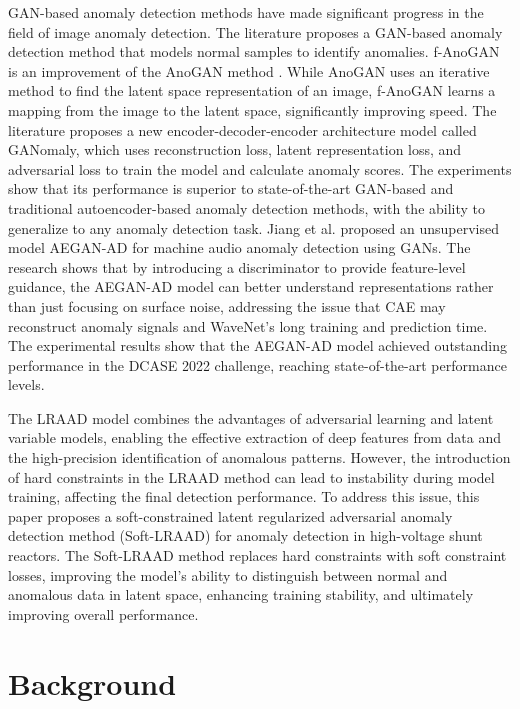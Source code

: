 \documentclass{article}
\begin{document}
GAN-based anomaly detection methods have made significant progress in the field of image anomaly detection. The literature \cite{anogan} proposes a GAN-based anomaly detection method that models normal samples to identify anomalies. f-AnoGAN \cite{f-anogan} is an improvement of the AnoGAN method \cite{anogan}. While AnoGAN uses an iterative method to find the latent space representation of an image, f-AnoGAN learns a mapping from the image to the latent space, significantly improving speed. The literature \cite{ganomaly} proposes a new encoder-decoder-encoder architecture model called GANomaly, which uses reconstruction loss, latent representation loss, and adversarial loss to train the model and calculate anomaly scores. The experiments show that its performance is superior to state-of-the-art GAN-based and traditional autoencoder-based anomaly detection methods, with the ability to generalize to any anomaly detection task. Jiang et al. \cite{AEGAN-AD} proposed an unsupervised model AEGAN-AD for machine audio anomaly detection using GANs. The research shows that by introducing a discriminator to provide feature-level guidance, the AEGAN-AD model can better understand representations rather than just focusing on surface noise, addressing the issue that CAE may reconstruct anomaly signals and WaveNet's long training and prediction time. The experimental results show that the AEGAN-AD model achieved outstanding performance in the DCASE 2022 challenge, reaching state-of-the-art performance levels.

The LRAAD model combines the advantages of adversarial learning and latent variable models, enabling the effective extraction of deep features from data and the high-precision identification of anomalous patterns. However, the introduction of hard constraints in the LRAAD method can lead to instability during model training, affecting the final detection performance. To address this issue, this paper proposes a soft-constrained latent regularized adversarial anomaly detection method (Soft-LRAAD) for anomaly detection in high-voltage shunt reactors. The Soft-LRAAD method replaces hard constraints with soft constraint losses, improving the model's ability to distinguish between normal and anomalous data in latent space, enhancing training stability, and ultimately improving overall performance.

\section{Background}
\end{document}
